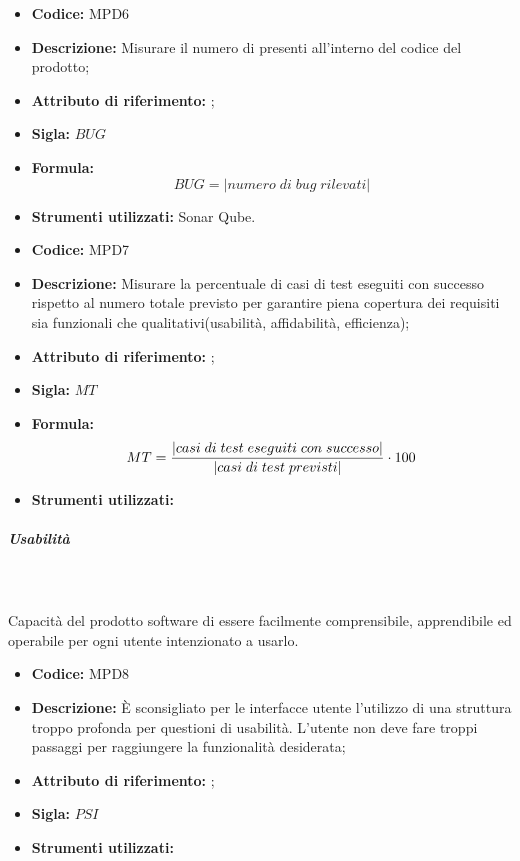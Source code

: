 \begin{itemize}
    \item \textbf{Codice:} MPD6
    \item \textbf{Descrizione:} Misurare il numero di  presenti all'interno del codice del prodotto;
    \item \textbf{Attributo di riferimento:} ;
    \item \textbf{Sigla:} $BUG$
    \item \textbf{Formula:} $$BUG = {|numero \; di \; bug \; rilevati|}$$
    \item \textbf{Strumenti utilizzati:} Sonar Qube.
\end{itemize}

\begin{itemize}
    \item \textbf{Codice:} MPD7
    \item \textbf{Descrizione:} Misurare la percentuale di casi di test eseguiti con successo rispetto al numero totale previsto per garantire piena copertura dei requisiti sia funzionali che qualitativi(usabilità, affidabilità, efficienza);
    \item \textbf{Attributo di riferimento:} ;
    \item \textbf{Sigla:} $MT$
    \item \textbf{Formula:} $$MT = {|casi \; di \; test \; eseguiti \; con \; successo| \over |casi \; di \; test \; previsti|} \cdot 100$$
    \item \textbf{Strumenti utilizzati:}
\end{itemize}
       
\subparagraph{Usabilità}\mbox{}\\ \\
Capacità del prodotto software di essere facilmente comprensibile, apprendibile ed operabile per ogni utente intenzionato a usarlo.

\begin{itemize}
    \item \textbf{Codice:} MPD8
    \item \textbf{Descrizione:} È sconsigliato per le interfacce utente l'utilizzo di una struttura troppo profonda per questioni di usabilità. L'utente non deve fare troppi passaggi per raggiungere la funzionalità desiderata;
    \item \textbf{Attributo di riferimento:} ;
    \item \textbf{Sigla:} $PSI$
    \item \textbf{Strumenti utilizzati:}
\end{itemize}

